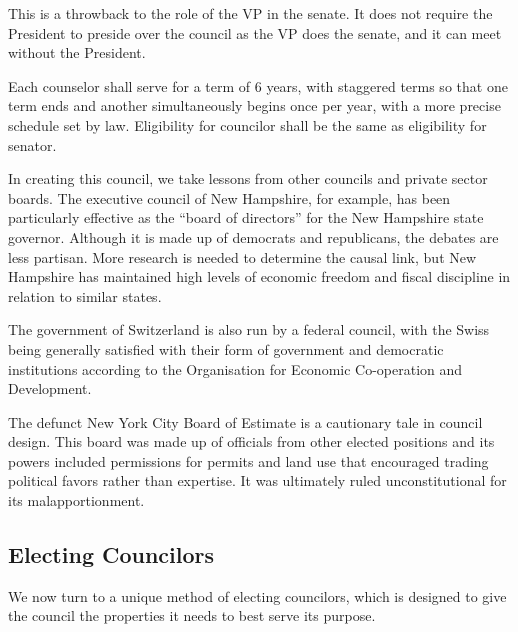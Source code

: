 \documentclass{article}
\begin{document}
This is a throwback to the role of the VP in the senate. It does not require the President to preside over the council as the VP does the senate, and it can meet without the President.

\begin{quoting}
Each counselor shall serve for a term of 6 years, with staggered terms so that one term ends and another simultaneously begins once per year, with a more precise schedule set by law. Eligibility for councilor shall be the same as eligibility for senator.
\end{quoting}

In creating this council, we take lessons from other councils and private sector boards. The executive council of New Hampshire, for example, has been particularly effective as the “board of directors” for the New Hampshire state governor\cite{Hahn-Burkett}. Although it is made up of democrats and republicans, the debates are less partisan\cite{Timmins}. More research is needed to determine the causal link, but New Hampshire has maintained high levels of economic freedom and fiscal discipline in relation to similar states\cite{Ruger}.

The government of Switzerland is also run by a federal council, with the Swiss being generally satisfied with their form of government and democratic institutions according to the Organisation for Economic Co-operation and Development\cite{Kaufman}.

The defunct New York City Board of Estimate is a cautionary tale in council design. This board was made up of officials from other elected positions and its powers included permissions for permits and land use that encouraged trading political favors rather than expertise\cite{Purnick}. It was ultimately ruled unconstitutional for its malapportionment\cite{Board_of_Estimate}.

\subsection{Electing Councilors}

We now turn to a unique method of electing councilors, which is designed to give the council the properties it needs to best serve its purpose.
\end{document}
